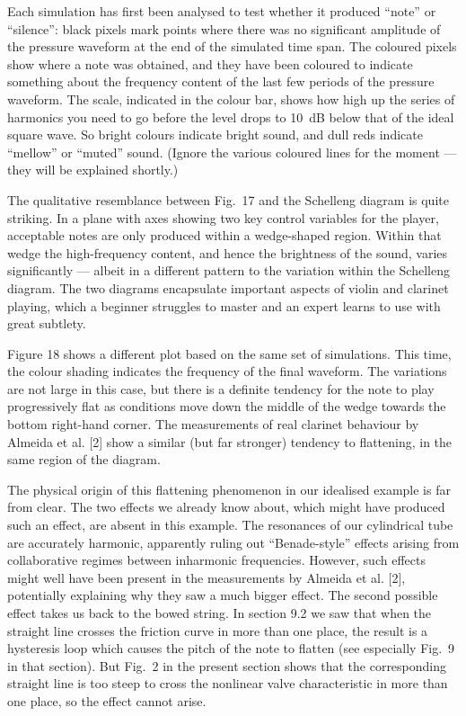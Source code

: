   Each simulation has first been analysed to test whether it produced “note” or 
  “silence”: black pixels mark points where there was no significant amplitude 
  of the pressure waveform at the end of the simulated time span. The coloured 
  pixels show where a note was obtained, and they have been coloured to 
  indicate something about the frequency content of the last few periods of the 
  pressure waveform. The scale, indicated in the colour bar, shows how high up 
  the series of harmonics you need to go before the level drops to 10~dB below 
  that of the ideal square wave. So bright colours indicate bright sound, and 
  dull reds indicate “mellow” or “muted” sound. (Ignore the various coloured 
  lines for the moment --- they will be explained shortly.) 

  The qualitative resemblance between Fig.\ 17 and the Schelleng diagram is 
  quite striking. In a plane with axes showing two key control variables for 
  the player, acceptable notes are only produced within a wedge-shaped region. 
  Within that wedge the high-frequency content, and hence the brightness of the 
  sound, varies significantly — albeit in a different pattern to the variation 
  within the Schelleng diagram. The two diagrams encapsulate important aspects 
  of violin and clarinet playing, which a beginner struggles to master and an 
  expert learns to use with great subtlety. 

  Figure 18 shows a different plot based on the same set of simulations. This 
  time, the colour shading indicates the frequency of the final waveform. The 
  variations are not large in this case, but there is a definite tendency for 
  the note to play progressively flat as conditions move down the middle of the 
  wedge towards the bottom right-hand corner. The measurements of real clarinet 
  behaviour by Almeida et al. [2] show a similar (but far stronger) tendency to 
  flattening, in the same region of the diagram. 

  The physical origin of this flattening phenomenon in our idealised example is 
  far from clear. The two effects we already know about, which might have 
  produced such an effect, are absent in this example. The resonances of our 
  cylindrical tube are accurately harmonic, apparently ruling out 
  “Benade-style” effects arising from collaborative regimes between inharmonic 
  frequencies. However, such effects might well have been present in the 
  measurements by Almeida et al. [2], potentially explaining why they saw a 
  much bigger effect. The second possible effect takes us back to the bowed 
  string. In section 9.2 we saw that when the straight line crosses the 
  friction curve in more than one place, the result is a hysteresis loop which 
  causes the pitch of the note to flatten (see especially Fig.\ 9 in that 
  section). But Fig.\ 2 in the present section shows that the corresponding 
  straight line is too steep to cross the nonlinear valve characteristic in 
  more than one place, so the effect cannot arise. 

